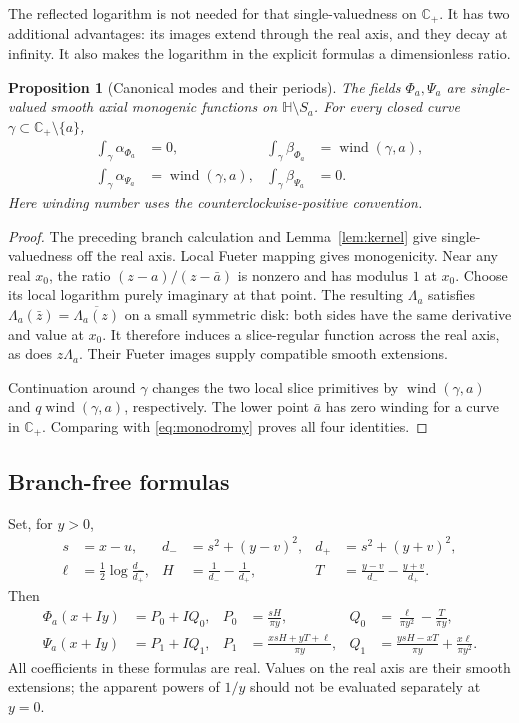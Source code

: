 \documentclass[11pt,a4paper]{article}
\numberwithin{equation}{section}
\newtheorem{proposition}[theorem]{Proposition}
\theoremstyle{definition}
\theoremstyle{remark}
\newcommand{\C}{\mathbb C}
\newcommand{\HH}{\mathbb H}
\newcommand{\ind}{\operatorname{wind}}
\begin{document}
The reflected logarithm is not needed for that single-valuedness on
$\C_+$. It has two additional advantages: its images extend through the
real axis, and they decay at infinity. It also makes the logarithm in
the explicit formulas a dimensionless ratio.

\begin{proposition}[Canonical modes and their periods]\label{prop:modes}
The fields $\Phi_a,\Psi_a$ are single-valued smooth axial monogenic
functions on $\HH\setminus S_a$. For every closed curve
$\gamma\subset\C_+\setminus\{a\}$,
\begin{align}
 \int_\gamma\alpha_{\Phi_a}&=0,&
 \int_\gamma\beta_{\Phi_a}&=\ind(\gamma,a),\label{eq:period-Phi}\\
 \int_\gamma\alpha_{\Psi_a}&=\ind(\gamma,a),&
 \int_\gamma\beta_{\Psi_a}&=0.\label{eq:period-Psi}
\end{align}
Here winding number uses the counterclockwise-positive convention.
\end{proposition}
\begin{proof}
The preceding branch calculation and Lemma~\ref{lem:kernel} give
single-valuedness off the real axis. Local Fueter mapping gives
monogenicity. Near any real $x_0$, the ratio
$(z-a)/(z-\bar a)$ is nonzero and has modulus $1$ at $x_0$. Choose its
local logarithm purely imaginary at that point. The resulting
$\Lambda_a$ satisfies
$\Lambda_a(\bar z)=\overline{\Lambda_a(z)}$ on a small symmetric disk:
both sides have the same derivative and value at $x_0$.
It therefore induces a slice-regular function across the real axis, as
does $z\Lambda_a$. Their Fueter images supply compatible smooth
extensions.

Continuation around $\gamma$ changes the two local slice primitives
by $\ind(\gamma,a)$ and $q\ind(\gamma,a)$, respectively. The lower
point $\bar a$ has zero winding for a curve in $\C_+$. Comparing with
\eqref{eq:monodromy} proves all four identities.
\end{proof}

\subsection{Branch-free formulas}
Set, for $y>0$,
\begin{align}
 s&=x-u,& d_-&=s^2+(y-v)^2,& d_+&=s^2+(y+v)^2,\label{eq:dpm}\\
 \ell&=\frac12\log\frac{d_-}{d_+},&
 H&=\frac1{d_-}-\frac1{d_+},&
 T&=\frac{y-v}{d_-}-\frac{y+v}{d_+}.\label{eq:HT}
\end{align}
Then
\begin{align}
 \Phi_a(x+Iy)&=P_0+IQ_0,&
 P_0&=\frac{sH}{\pi y},&
 Q_0&=\frac{\ell}{\pi y^2}-\frac{T}{\pi y},\label{eq:Phi-explicit}\\
 \Psi_a(x+Iy)&=P_1+IQ_1,&
 P_1&=\frac{xsH+yT+\ell}{\pi y},&
 Q_1&=\frac{ysH-xT}{\pi y}+\frac{x\ell}{\pi y^2}.
 \label{eq:Psi-explicit}
\end{align}
All coefficients in these formulas are real. Values on the real axis
are their smooth extensions; the apparent powers of $1/y$ should not
be evaluated separately at $y=0$.
\end{document}

